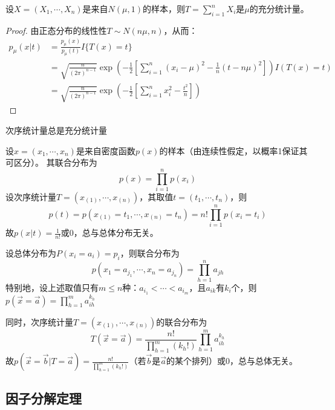 \documentclass[UTF-8]{ctexbeamer}
\begin{document}
\begin{frame}
  \begin{Eg}
    设$X=(X_{1},\cdots,X_{n})$是来自$N(\mu,1)$的样本，则$T=\sum_{i=1}^{n}X_{i}$是$\mu$的充分统计量。
    \end{Eg}
\begin{proof}
    由正态分布的线性性$T\sim N(n\mu,n)$，从而：
    \begin{align*}
      p_{\mu}(x|t)&=\frac{p_{\mu}(x)}{p_{\mu}(t)}I\{T(x)=t\}\\
                 &=\sqrt{\frac{n}{(2\pi)^{n-1}}}\exp(-\frac{1}{2}[\sum\limits^{n}_{i=1}(x_{i}-\mu)^{2}-\frac{1}{n}(t-n\mu)^{2}])I(T(x)=t)\\
                 &=\sqrt{\frac{n}{(2\pi)^{n-1}}}\exp(-\frac{1}{2}[\sum\limits^{n}_{i=1}x^{2}_{i}-\frac{t^{2}}{n}])
    \end{align*}
\end{proof}
\end{frame}

\begin{frame}
  次序统计量总是充分统计量
  \begin{Eg}
    设$x=(x_{1},\cdots,x_{n})$是来自密度函数$p(x)$的样本（由连续性假定，以概率1保证其可区分）。
    其联合分布为
    \[p(x)=\prod_{i=1}^{n}p(x_{i})\]
    设次序统计量$T=(x_{(1)},\cdots,x_{(n)})$，其取值$t=(t_{1},\cdots,t_{n})$，则
    \[p(t)=p(x_{(1)}=t_{1},\cdots,x_{(n)}=t_{n})=n!\prod_{i=1}^{n}p(x_{i}=t_{i})\]
    故$p(x|t)=\frac{1}{n!}$或0，总与总体分布无关。
  \end{Eg}
\end{frame}

\begin{frame}
  \begin{Eg}
    设总体分布为$P(x_{i}=a_{i})=p_{i}$，则联合分布为
    \[p(x_{1}=a_{j_{1}},\cdots,x_{n}=a_{{j_{n}}})=\prod_{h=1}^{n}a_{jh}\]
    特别地，设上述取值只有$m\leq n$种：$a_{i_{1}}<\cdots<a_{i_{m}}$，且$a_{ik}$有$k_{i}$个，则
    $p(\vec x=\vec a)=\prod_{h=1}^{m}a_{ih}^{k_{h}}$

    同时，次序统计量$T=(x_{(1)},\cdots,x_{(n)})$的联合分布为
    \[T(\vec x=\vec a)=\frac{n!}{\prod_{h=1}^{m}(k_{h}!)}\prod_{h=1}^{m}a_{ih}^{k_{h}}\]
    故$p(\vec x=\vec b|T=\vec a)=\frac{n!}{\prod_{h=1}^{m}(k_{h}!)}$（若$\vec b$是$\vec a$的某个排列）或0，总与总体无关。
  \end{Eg}
\end{frame}


\subsection{因子分解定理}
\end{document}
